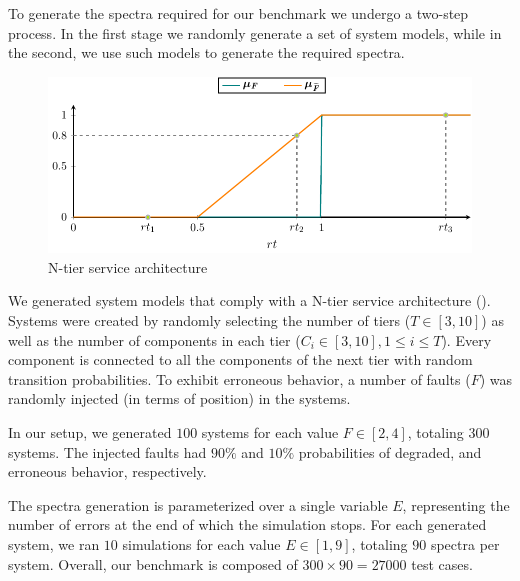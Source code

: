 To generate the spectra required for our benchmark we undergo
a two-step process.
%
In the first stage we randomly generate a set of system models, while
in the second, we use such models to generate the required spectra.

\begin{figure}[ht]
  \includegraphics[page=10]{figures/fuzzinel/figures/main.pdf}
  \caption{N-tier service architecture\label{fig:fuzzinel:ntier}}
\end{figure}

We generated system models that comply with a N-tier service
architecture ().
%
Systems were created by randomly selecting the number of tiers ($T \in
[3,10]$) as well as the number of components in each tier ($C_i \in
[3,10], 1 \leq i \leq T$).
%
Every component is connected to all the components of the next tier
with random transition probabilities.
%
To exhibit erroneous behavior, a number of faults ($F$) was randomly
injected (in terms of position) in the systems.

In our setup, we generated $100$ systems for each value $F \in [2,4]$,
totaling $300$ systems.
%
The injected faults had $90\%$ and $10\%$ probabilities of degraded,
and erroneous behavior, respectively.
%

The spectra generation is parameterized over a single variable $E$,
representing the number of errors at the end of which the simulation
stops.
%
For each generated system, we ran $10$ simulations for each value $E
\in [1,9]$, totaling $90$ spectra per system.
%
Overall, our benchmark is composed of $300 \times 90 = 27000$ test
cases.


